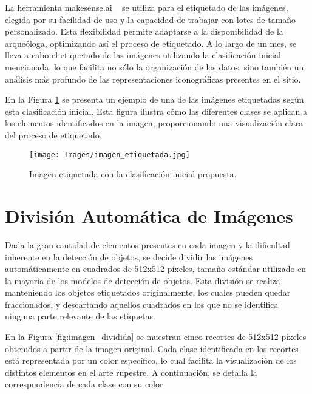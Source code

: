 La herramienta makesense.ai ~\cite{makesense} se utiliza para el etiquetado de las imágenes, elegida por su facilidad de uso y la capacidad de trabajar con lotes de tamaño personalizado.
Esta flexibilidad permite adaptarse a la disponibilidad de la arqueóloga, optimizando así el proceso de etiquetado.
A lo largo de un mes, se lleva a cabo el etiquetado de las imágenes utilizando la clasificación inicial mencionada, lo que facilita no sólo la organización de los datos, sino también un análisis más profundo de las representaciones iconográficas presentes en el sitio.

En la Figura \ref{fig:imagen_etiquetada} se presenta un ejemplo de una de las imágenes etiquetadas según esta clasificación inicial.
Esta figura ilustra cómo las diferentes clases se aplican a los elementos identificados en la imagen, proporcionando una visualización clara del proceso de etiquetado.

\begin{figure}[ht!]
    \centering
    \texttt{[image: Images/imagen\_etiquetada.jpg]}
    \caption{Imagen etiquetada con la clasificación inicial propuesta.}
    \label{fig:imagen_etiquetada}
\end{figure}

\section{División Automática de Imágenes}
Dada la gran cantidad de elementos presentes en cada imagen y la dificultad inherente en la detección de objetos, se decide dividir las imágenes automáticamente en cuadrados de 512x512 píxeles, tamaño estándar utilizado en la mayoría de los modelos de detección de objetos.
Esta división se realiza manteniendo los objetos etiquetados originalmente, los cuales pueden quedar fraccionados, y descartando aquellos cuadrados en los que no se identifica ninguna parte relevante de las etiquetas.

En la Figura \ref{fig:imagen_dividida} se muestran cinco recortes de 512x512 píxeles obtenidos a partir de la imagen original.
Cada clase identificada en los recortes está representada por un color específico, lo cual facilita la visualización de los distintos elementos en el arte rupestre.
A continuación, se detalla la correspondencia de cada clase con su color:

